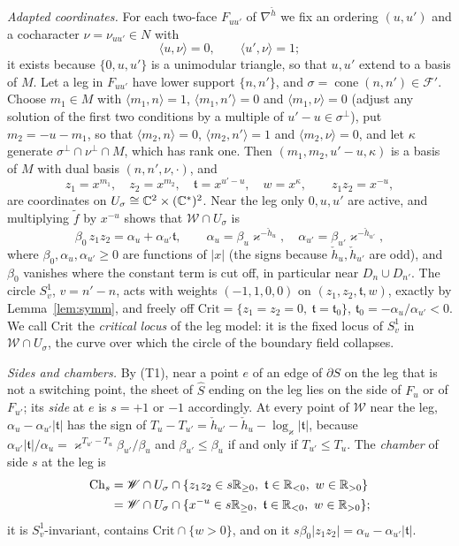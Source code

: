 \emph{Adapted coordinates.} For each two-face $F_{uu'}$ of $\nabla^{\check h}$ we fix an ordering $(u,u')$ and a cocharacter
$\nu=\nu_{uu'}\in N$ with
\[
\langle u,\nu\rangle=0,\qquad\langle u',\nu\rangle=1;
\]
it exists because $\{0,u,u'\}$ is a unimodular triangle, so that $u,u'$ extend to a basis of $M$. Let a leg in $F_{uu'}$ have
lower support $\{n,n'\}$, and $\sigma=\operatorname{cone}(n,n')\in\mathcal F'$. Choose $m_1\in M$ with $\langle m_1,n\rangle=1$,
$\langle m_1,n'\rangle=0$ and $\langle m_1,\nu\rangle=0$ (adjust any solution of the first two conditions by a multiple of
$u'-u\in\sigma^\perp$), put $m_2=-u-m_1$, so that $\langle m_2,n\rangle=0$, $\langle m_2,n'\rangle=1$ and
$\langle m_2,\nu\rangle=0$, and let $\kappa$ generate $\sigma^\perp\cap\nu^\perp\cap M$, which has rank one. Then
$(m_1,m_2,u'-u,\kappa)$ is a basis of $M$ with dual basis $(n,n',\nu,\cdot)$, and
\[
z_1=x^{m_1},\quad z_2=x^{m_2},\quad\mathfrak t=x^{u'-u},\quad w=x^\kappa,\qquad z_1z_2=x^{-u},
\]
are coordinates on $U_\sigma\cong\mathbb C^2\times(\mathbb C^*)^2$. Near the leg only $0,u,u'$ are active, and multiplying $\tilde f$ by
$x^{-u}$ shows that $\mathscr W\cap U_\sigma$ is
\begin{equation}\label{eq:legmodelA}
\beta_0\,z_1z_2=\alpha_u+\alpha_{u'}\mathfrak t,\qquad\alpha_u=\beta_u\varkappa^{-\check h_u},\quad\alpha_{u'}=\beta_{u'}\varkappa^{-\check h_{u'}},
\end{equation}
where $\beta_0,\alpha_u,\alpha_{u'}\ge0$ are functions of $|x|$ (the signs because $\check h_u,\check h_{u'}$ are odd), and
$\beta_0$ vanishes where the constant term is cut off, in particular near $D_n\cup D_{n'}$. The circle $S^1_v$, $v=n'-n$, acts
with weights $(-1,1,0,0)$ on $(z_1,z_2,\mathfrak t,w)$, exactly by Lemma~\ref{lem:symm}, and freely off
$\mathrm{Crit}=\{z_1=z_2=0,\ \mathfrak t=\mathfrak t_0\}$, $\mathfrak t_0=-\alpha_u/\alpha_{u'}<0$. We call $\mathrm{Crit}$ the
\emph{critical locus} of the leg model: it is the fixed locus of $S^1_v$ in $\mathscr W\cap U_\sigma$, the curve over which the circle of
the boundary field collapses.

\emph{Sides and chambers.} By (T1), near a point $e$ of an edge of $\partial S$ on the leg that is not a switching point, the
sheet of $\hat S$ ending on the leg lies on the side of $F_u$ or of $F_{u'}$; its \emph{side} at $e$ is $s=+1$ or
$-1$ accordingly. At every point of $\mathscr W$ near the leg, $\alpha_u-\alpha_{u'}|\mathfrak t|$ has the sign of
$T_u-T_{u'}=\check h_{u'}-\check h_u-\log_\varkappa|\mathfrak t|$, because
$\alpha_{u'}|\mathfrak t|/\alpha_u=\varkappa^{T_{u'}-T_u}\beta_{u'}/\beta_u$ and $\beta_{u'}\le\beta_u$ if and only if $T_{u'}\le T_u$.
The \emph{chamber} of side $s$ at the leg is
\begin{align*}
\mathrm{Ch}_s&=\mathscr W\cap U_\sigma\cap\{z_1z_2\in s\R_{\ge0},\ \mathfrak t\in\R_{<0},\ w\in\R_{>0}\}\\
&=\mathscr W\cap U_\sigma\cap\{x^{-u}\in s\R_{\ge0},\ \mathfrak t\in\R_{<0},\ w\in\R_{>0}\};
\end{align*}
it is $S^1_v$-invariant, contains $\mathrm{Crit}\cap\{w>0\}$, and on it
$s\beta_0|z_1z_2|=\alpha_u-\alpha_{u'}|\mathfrak t|$.

